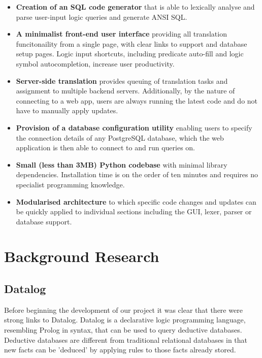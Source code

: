 \documentclass[a4paper, 11pt]{article}
\begin{document}
    \begin{itemize}
      \item \textbf{Creation of an SQL code generator} that is able to lexically
      analyse and parse user-input logic queries and generate ANSI SQL.

      \item \textbf{A minimalist front-end user interface} providing all
      translation funcitonaility from a single page, with clear links to
      support and database setup pages. Logic input shortcuts, including
      predicate auto-fill and logic symbol autocompletion, increase user
      productivity.

      \item \textbf{Server-side translation} provides queuing of translation
      tasks and assignment to multiple backend servers. Additionally, by the
      nature of connecting to a web app, users are always running the latest
      code and do not have to manually apply updates.

      \item \textbf{Provision of a database configuration utility} enabling
      users to specify the connection details of any PostgreSQL database, which
      the web application is then able to connect to and run queries on.

      \item \textbf{Small (less than 3MB) Python codebase} with minimal
      library dependencies. Installation time is on the order of ten minutes
      and requires no specialist programming knowledge.

      \item \textbf{Modularised architecture} to which specific code changes
      and updates can be quickly applied to individual sections including the
      GUI, lexer, parser or database support.
    \end{itemize}

\section{Background Research}
\label{sec:background}

\subsection{Datalog}
Before beginning the development of our project it was clear that there were strong links to Datalog. Datalog is a declarative logic programming language, resembling Prolog in syntax, that can be used to query deductive databases. Deductive databases are different from traditional relational databases in that new facts can be 'deduced' by applying rules to those facts already stored.
\end{document}
